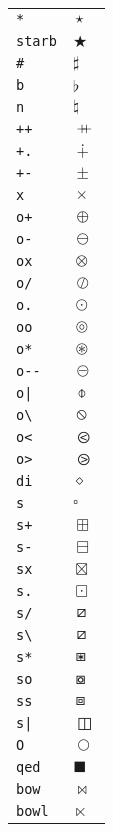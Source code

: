 \begin{longtable}{ll}
\texttt{*}&${}\star {}$\\
\texttt{starb}&${}\bigstar {}$\\
\texttt{\#}&${}\sharp {}$\\
\texttt{b}&${}\flat {}$\\
\texttt{n}&${}\natural {}$\\
\texttt{++}&${}\mathbin{{+}\mspace{-8mu}{+}} {}$\\
\texttt{+.}&${}\dotplus {}$\\
\texttt{+{-}}&${}\pm {}$\\
\texttt{x}&${}\times {}$\\
\texttt{o+}&${}\oplus {}$\\
\texttt{o{-}}&${}\ominus {}$\\
\texttt{ox}&${}\otimes {}$\\
\texttt{o/}&${}\oslash {}$\\
\texttt{o.}&${}\odot {}$\\
\texttt{oo}&${}\circledcirc {}$\\
\texttt{o*}&${}\circledast {}$\\
\texttt{o{-}{-}}&${}\circleddash {}$\\
\texttt{o|}&${}\obar {}$\\
\texttt{o\textbackslash }&${}\obslash {}$\\
\texttt{o<}&${}\olessthan {}$\\
\texttt{o>}&${}\ogreaterthan {}$\\
\texttt{di}&${}\diamond {}$\\
\texttt{s}&${}\square {}$\\
\texttt{s+}&${}\boxplus {}$\\
\texttt{s{-}}&${}\boxminus {}$\\
\texttt{sx}&${}\boxtimes {}$\\
\texttt{s.}&${}\boxdot {}$\\
\texttt{s/}&${}\boxslash {}$\\
\texttt{s\textbackslash }&${}\boxslash {}$\\
\texttt{s*}&${}\boxast {}$\\
\texttt{so}&${}\boxcircle {}$\\
\texttt{ss}&${}\boxbox {}$\\
\texttt{s|}&${}\boxbar {}$\\
\texttt{O}&${}\bigcirc {}$\\
\texttt{qed}&${}\blacksquare {}$\\
\texttt{bow}&${}\bowtie {}$\\
\texttt{bowl}&${}\ltimes {}$\\

\end{longtable}
